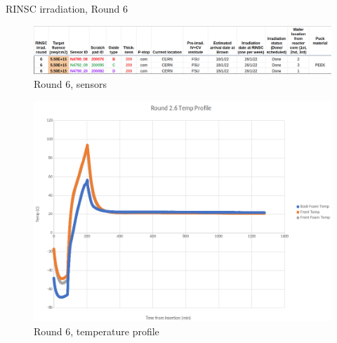 \documentclass{beamer}
\begin{document}
\begin{frame}{RINSC irradiation, Round 6}
    \begin{figure}
        \includegraphics[width=.7\textwidth]{plots/Round_6_sensors.png}
        \caption{Round 6, sensors}
    \end{figure}
    \begin{figure}
      \includegraphics[width=.5\textwidth]{plots/Round6_temp_profile.png}
      \caption{Round 6, temperature profile}
    \end{figure}
\end{frame}
\end{document}
